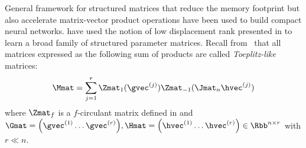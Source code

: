 

General framework for structured matrices that reduce the memory footprint but also accelerate matrix-vector product operations have been used to build compact neural networks.
\citet{sindhwani2015structured} have used the notion of low displacement rank presented in  to learn a broad family of structured parameter matrices.
Recall from~ that all matrices expressed as the following sum of products are called \emph{Toeplitz-like} matrices:
\begin{equation}
    \Mmat = \sum_{j=1}^{r} \Zmat_1(\gvec^{(j)}) \Zmat_{-1}(\Jmat_n \hvec^{(j)})
\end{equation}
where $\Zmat_f$ is a $f$-circulant matrix defined in  and $\Gmat = \leftmat \gvec^{(1)} \ldots \gvec^{(r)} \rightmat, \Hmat = \leftmat \hvec^{(1)} \ldots \hvec^{(r)} \rightmat \in \Rbb^{n \times r}$ with $r \ll n$.

